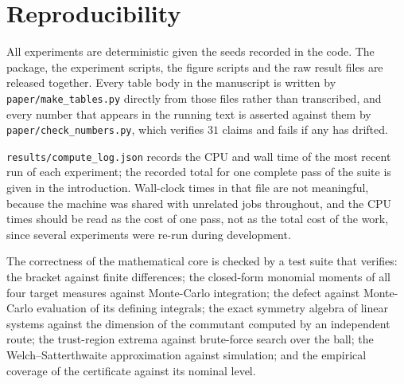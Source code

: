 \section{Reproducibility}
\label{app:repro}

All experiments are deterministic given the seeds recorded in the code. The
package, the experiment scripts, the figure scripts and the raw result files are
released together. Every table body in the manuscript is written by
\texttt{paper/make\_tables.py} directly from those files rather than
transcribed, and every number that appears in the running text is asserted
against them by \texttt{paper/check\_numbers.py}, which verifies $31$ claims and
fails if any has drifted.

\texttt{results/compute\_log.json} records the CPU and wall time of the most
recent run of each experiment; the recorded total for one complete pass of the
suite is given in the introduction. Wall-clock times in that file are not
meaningful, because the machine was shared with unrelated jobs throughout, and the
CPU times should be read as the cost of one pass, not as the total cost of the
work, since several experiments were re-run during development.

The correctness of the mathematical core is checked by a test suite that
verifies: the bracket against finite differences; the closed-form monomial
moments of all four target measures against Monte-Carlo integration; the defect
against Monte-Carlo evaluation of its defining integrals; the exact symmetry
algebra of linear systems against the dimension of the commutant computed by an
independent route; the trust-region extrema against brute-force search over the
ball; the Welch--Satterthwaite approximation against simulation; and the
empirical coverage of the certificate against its nominal level.

